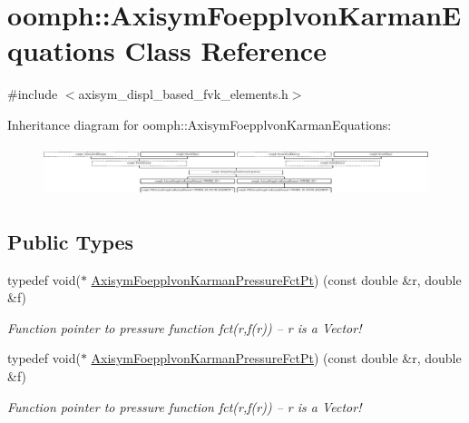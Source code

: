 \hypertarget{classoomph_1_1AxisymFoepplvonKarmanEquations}{}\section{oomph\+:\+:Axisym\+Foepplvon\+Karman\+Equations Class Reference}
\label{classoomph_1_1AxisymFoepplvonKarmanEquations}


{\ttfamily \#include $<$axisym\+\_\+displ\+\_\+based\+\_\+fvk\+\_\+elements.\+h$>$}

Inheritance diagram for oomph\+:\+:Axisym\+Foepplvon\+Karman\+Equations\+:\begin{figure}[H]
\begin{center}
\leavevmode
\includegraphics[height=1.489362cm]{classoomph_1_1AxisymFoepplvonKarmanEquations}
\end{center}
\end{figure}
\subsection*{Public Types}
\begin{DoxyCompactItemize}
\item 
typedef void($\ast$ \hyperlink{classoomph_1_1AxisymFoepplvonKarmanEquations_a504878b18d793ef8a6540eb0f2b086c8}{Axisym\+Foepplvon\+Karman\+Pressure\+Fct\+Pt}) (const double \&r, double \&f)
\begin{DoxyCompactList}\small\item\em Function pointer to pressure function fct(r,f(r)) -- r is a Vector! \end{DoxyCompactList}\item 
typedef void($\ast$ \hyperlink{classoomph_1_1AxisymFoepplvonKarmanEquations_a504878b18d793ef8a6540eb0f2b086c8}{Axisym\+Foepplvon\+Karman\+Pressure\+Fct\+Pt}) (const double \&r, double \&f)
\begin{DoxyCompactList}\small\item\em Function pointer to pressure function fct(r,f(r)) -- r is a Vector! \end{DoxyCompactList}\end{DoxyCompactItemize}

